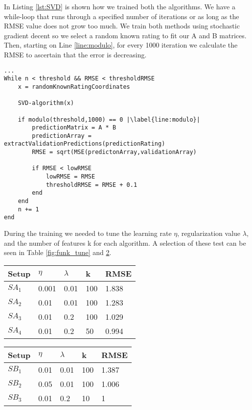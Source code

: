 In Listing \ref{lst:SVD} is shown how we trained both the algorithms. We have a while-loop that runs through a specified number of iterations or as long as the RMSE value does not grow too much.
We train both methods using stochastic gradient decent so we select a random known rating to fit our A and B matrices. Then, starting on Line \ref{line:modulo}, for every 1000 iteration we calculate the RMSE to ascertain that the error is decreasing. 

\begin{lstlisting}[caption={Training of the prediction matrix},label=lst:SVD,escapechar=|]
...
While n < threshold && RMSE < thresholdRMSE
	x = randomKnownRatingCoordinates
	
	SVD-algorithm(x)
	
	if modulo(threshold,1000) == 0 |\label{line:modulo}|
		predictionMatrix = A * B
		predictionArray = extractValidationPredictions(predictionRating)
		RMSE = sqrt(MSE(predictonArray,validationArray)	
		
		if RMSE < lowRMSE 
			lowRMSE = RMSE 
			thresholdRMSE = RMSE + 0.1
		end
	end
	n += 1
end
\end{lstlisting}

During the training we needed to tune the learning rate $\eta$, regularization value $\lambda$, and the number of features k for each algorithm. A selection of these test can be seen in Table \ref{fig:funk_tune} and \ref{fig:SVD_tune}.
\begin{table}[h]
\centering
\begin{minipage}{.48\textwidth}\centering
\begin{tabular}{|l|llll|}
\hline
Setup	& $\eta$ & $\lambda$ & k   & RMSE   \\ \hline
$SA_1$	& 0.001  & 0.01      & 100 & 1.838 \\ \hline
$SA_2$	& 0.01   & 0.01      & 100 & 1.283 \\ \hline
$SA_3$	& 0.01   & 0.2       & 100 & 1.029 \\ \hline
$SA_4$	& 0.01   & 0.2		 & 50  & 0.994 \\ \hline
\end{tabular}
\label{fig:funk_tune}
\end{minipage}
\hfill
\begin{minipage}{.48\textwidth}\centering
\begin{tabular}{|l|llll|}
\hline
Setup	& $\eta$ & $\lambda$ & k   & RMSE \\ \hline
$SB_1$	& 0.01   & 0.01   & 100 & 1.387   \\ \hline
$SB_2$	& 0.05   & 0.01   & 100 & 1.006  \\ \hline
$SB_3$	& 0.01   & 0.2    & 10 	& 1		  \\ \hline
\end{tabular}
\label{fig:SVD_tune}
\end{minipage}
\end{table}


